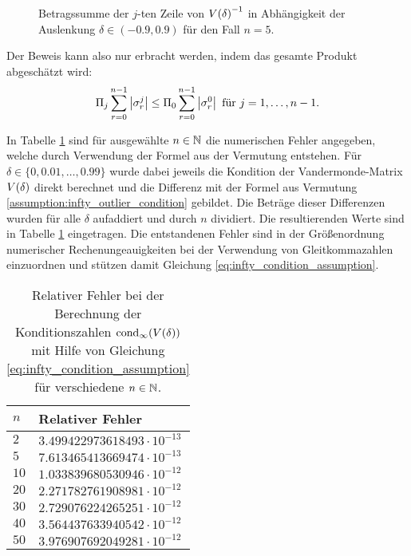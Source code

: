 \begin{remark}
    \begin{figure}[H]
        \centering
        
        \caption{Betragssumme der $j$-ten Zeile von $\Vand{\delta}^{-1}$
        in Abhängigkeit der Auslenkung $\delta \in (-0.9, 0.9)$
        für den Fall $n=5$.}
        \label{fig:row_j}
    \end{figure}

    \noindent Der Beweis kann also nur erbracht werden, indem das gesamte Produkt
    abgeschätzt wird:
    \[
        \Pi_j \sum_{r=0}^{n-1} \abs{\sigma_r^j} \leq \Pi_0 \sum_{r=0}^{n-1} \abs{\sigma_r^0} \text{ für } j=1, \dots, n-1.
    \]


    \noindent In Tabelle \ref{tab:relative_error_assumption} sind für ausgewählte
    $n \in \N$ die numerischen Fehler angegeben, welche durch Verwendung der
    Formel aus der Vermutung entstehen.
    Für $\delta \in \{ 0, 0.01, \dots, 0.99 \}$ wurde dabei jeweils die
    Kondition der Vandermonde-Matrix $\Vand{\delta}$ direkt berechnet und die
    Differenz mit der Formel aus Vermutung
    \ref{assumption:infty_outlier_condition} gebildet.
    Die Beträge dieser Differenzen wurden für alle $\delta$ aufaddiert und
    durch $n$ dividiert.
    Die resultierenden Werte sind in Tabelle
    \ref{tab:relative_error_assumption} eingetragen.
    Die entstandenen Fehler sind in der Größenordnung numerischer
    Rechenungeauigkeiten bei der Verwendung von Gleitkommazahlen einzuordnen
    und stützen damit Gleichung \eqref{eq:infty_condition_assumption}.
    \begin{table}[h]
        \centering
        \begin{tabular}[c]{l|l}
            $ n $ & Relativer Fehler \\
            \hline
            $ 2  $ & $ 3.499422973618493 \cdot 10^{-13} $ \\
            $ 5  $ & $ 7.613465413669474 \cdot 10^{-13} $ \\
            $ 10 $ & $ 1.033839680530946 \cdot 10^{-12} $ \\
            $ 20 $ & $ 2.271782761908981 \cdot 10^{-12} $ \\
            $ 30 $ & $ 2.729076224265251 \cdot 10^{-12} $ \\
            $ 40 $ & $ 3.564437633940542 \cdot 10^{-12} $ \\
            $ 50 $ & $ 3.976907692049281 \cdot 10^{-12} $
        \end{tabular}
        \caption{Relativer Fehler bei der Berechnung der Konditionszahlen
                $\cond[\infty]{\Vand{\delta}}$ mit Hilfe von Gleichung
                \eqref{eq:infty_condition_assumption} für verschiedene $n\in\N$.}
        \label{tab:relative_error_assumption}
    \end{table}

\end{remark}

